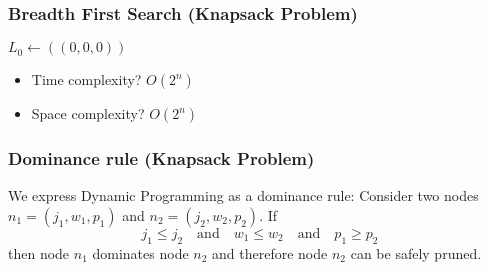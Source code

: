 \documentclass{beamer}
\begin{document}
\begin{frame}
\begin{center}
  \end{center}
\end{frame}

\begin{frame}
  \frametitle{Breadth First Search (Knapsack Problem)}

  \begin{algorithmic}
    \State$L_0 \gets ((0, 0, 0))$
    \EndIf
    \EndFor
    \EndFor
    \EndProcedure{}
  \end{algorithmic}

  \begin{itemize}
    \item \pause Time complexity? \pause $O(2^n)$
    \item \pause Space complexity? \pause $O(2^n)$
  \end{itemize}

\end{frame}

\begin{frame}
  \frametitle{Dominance rule (Knapsack Problem)}

  We express Dynamic Programming as a dominance rule:
  Consider two nodes $n_1 = (j_1, w_1, p_1)$ and $n_2 = (j_2, w_2, p_2)$.
  If
  \begin{displaymath}
    j_1 \le j_2 \quad \text{and} \quad w_1 \le w_2 \quad \text{and} \quad p_1 \ge p_2
  \end{displaymath}
  then node $n_1$ dominates node $n_2$ and therefore node $n_2$ can be safely pruned.
\end{frame}
\end{document}
